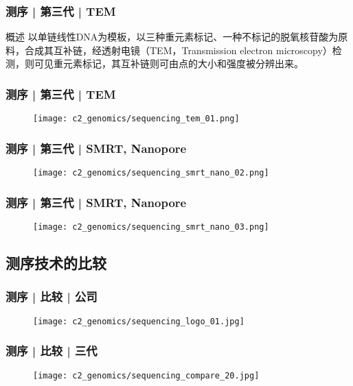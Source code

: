 \begin{frame}
  \frametitle{测序 | 第三代 | TEM}
  \begin{block}{概述}
以单链线性DNA为模板，以三种重元素标记、一种不标记的脱氧核苷酸为原料，合成其互补链，经透射电镜（TEM，Transmission electron microscopy）检测，则可见重元素标记，其互补链则可由点的大小和强度被分辨出来。
  \end{block}
\end{frame}

\begin{frame}
  \frametitle{测序 | 第三代 | TEM}
  \begin{figure}
    \centering
    \texttt{[image: c2\_genomics/sequencing\_tem\_01.png]}
  \end{figure}
\end{frame}

\begin{frame}
  \frametitle{测序 | 第三代 | SMRT, Nanopore}
  \begin{figure}
    \centering
    \texttt{[image: c2\_genomics/sequencing\_smrt\_nano\_02.png]}
  \end{figure}
\end{frame}

\begin{frame}
  \frametitle{测序 | 第三代 | SMRT, Nanopore}
  \begin{figure}
    \centering
    \texttt{[image: c2\_genomics/sequencing\_smrt\_nano\_03.png]}
  \end{figure}
\end{frame}

\subsection{测序技术的比较}
\begin{frame}
  \frametitle{测序 | 比较 | 公司}
  \begin{figure}
    \centering
    \texttt{[image: c2\_genomics/sequencing\_logo\_01.jpg]}
  \end{figure}
\end{frame}

\begin{frame}
  \frametitle{测序 | 比较 | 三代}
  \begin{figure}
    \centering
    \texttt{[image: c2\_genomics/sequencing\_compare\_20.jpg]}
  \end{figure}
\end{frame}

